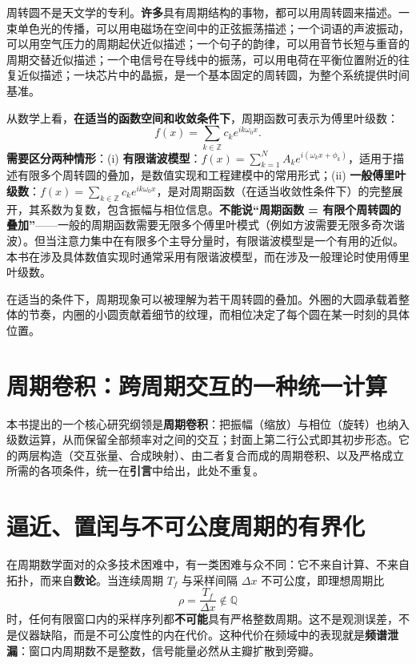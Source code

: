 周转圆不是天文学的专利。\textbf{许多}具有周期结构的事物，都可以用周转圆来描述。一束单色光的传播，可以用电磁场在空间中的正弦振荡描述；一个词语的声波振动，可以用空气压力的周期起伏近似描述；一个句子的韵律，可以用音节长短与重音的周期交替近似描述；一个电信号在导线中的振荡，可以用电荷在平衡位置附近的往复近似描述；一块芯片中的晶振，是一个基本固定的周转圆，为整个系统提供时间基准。

从数学上看，\textbf{在适当的函数空间和收敛条件下}，周期函数可表示为傅里叶级数：
\[
f(x) = \sum_{k \in \mathbb{Z}} c_k e^{i k \omega_0 x}.
\]
\textbf{需要区分两种情形}：(i) \textbf{有限谐波模型}：$f(x) = \sum_{k=1}^{N} A_k e^{i(\omega_k x + \phi_k)}$，适用于描述有限多个周转圆的叠加，是数值实现和工程建模中的常用形式；(ii) \textbf{一般傅里叶级数}：$f(x) = \sum_{k \in \mathbb{Z}} c_k e^{i k \omega_0 x}$，是对周期函数（在适当收敛性条件下）的完整展开，其系数为复数，包含振幅与相位信息。\textbf{不能说“周期函数 = 有限个周转圆的叠加”}——一般的周期函数需要无限多个傅里叶模式（例如方波需要无限多奇次谐波）。但当注意力集中在有限多个主导分量时，有限谐波模型是一个有用的近似。本书在涉及具体数值实现时通常采用有限谐波模型，而在涉及一般理论时使用傅里叶级数。

在适当的条件下，周期现象可以被理解为若干周转圆的叠加。外圈的大圆承载着整体的节奏，内圈的小圆贡献着细节的纹理，而相位决定了每个圆在某一时刻的具体位置。

\section*{周期卷积：跨周期交互的一种统一计算}

本书提出的一个核心研究纲领是\textbf{周期卷积}：把振幅（缩放）与相位（旋转）也纳入级数运算，从而保留全部频率对之间的交互；封面上第二行公式即其初步形态。它的两层构造（交互张量、合成映射）、由二者复合而成的周期卷积、以及严格成立所需的各项条件，统一在\textbf{引言}中给出，此处不重复。

\section*{逼近、置闰与不可公度周期的有界化}

在周期数学面对的众多技术困难中，有一类困难与众不同：它不来自计算、不来自拓扑，而来自\textbf{数论}。当连续周期 $T_f$ 与采样间隔 $\Delta x$ 不可公度，即理想周期比
\[
\rho = \frac{T_f}{\Delta x} \notin \mathbb{Q}
\]
时，任何有限窗口内的采样序列都\textbf{不可能}具有严格整数周期。这不是观测误差，不是仪器缺陷，而是不可公度性的内在代价。这种代价在频域中的表现就是\textbf{频谱泄漏}：窗口内周期数不是整数，信号能量必然从主瓣扩散到旁瓣。

